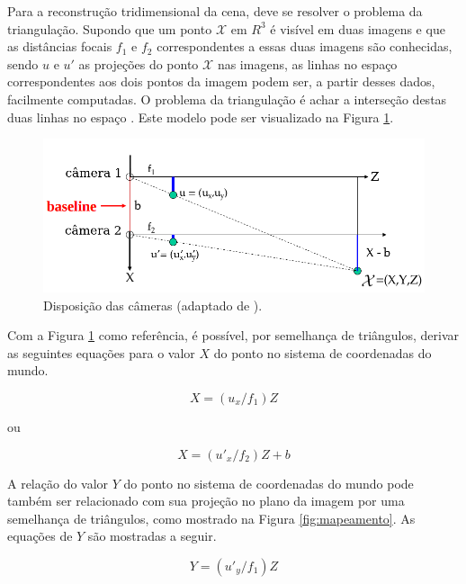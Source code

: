 {Para a reconstrução tridimensional da cena, deve se resolver o problema da
triangulação. Supondo que um ponto $\mathcal{X}$ em $R^3$ é visível em duas
imagens e que as distâncias focais $f_1$ e $f_2$ correspondentes a essas duas
imagens são conhecidas, sendo $u$ e $u'$ as projeções do ponto $\mathcal{X}$ nas
imagens, as linhas no espaço correspondentes aos dois pontos da imagem podem
ser, a partir desses dados, facilmente computadas. O problema da triangulação é
achar a interseção destas duas linhas no espaço \cite{hartley1997triangulation}.
Este modelo pode ser visualizado na Figura \ref{fig:disp_cameras}.

\begin{figure}[h!]
\centering
\includegraphics[width=.72\linewidth]{figs/TG_triangulation_pdf_washington_pt2.png}
\caption{Disposição das câmeras (adaptado de \cite{stereovision-washington-pdf}).}
\label{fig:disp_cameras}
\end{figure}


Com a Figura \ref{fig:disp_cameras} como referência, é possível, por semelhança
de triângulos, derivar as seguintes equações para o valor $X$ do ponto no
sistema de coordenadas do mundo.

\begin{equation}
X = (u_x/f_1)  Z
\label{eq:3d_realX1}
\end{equation}   

ou

\begin{equation}
X = (u'_x/f_2)  Z + b
\label{eq:3d_realX2}
\end{equation}  

A relação do valor $Y$ do ponto no sistema de coordenadas do mundo pode também
ser relacionado com sua projeção no plano da imagem por uma semelhança de
triângulos, como mostrado na Figura \ref{fig:mapeamento}. As equações de $Y$ são
mostradas a seguir.

\begin{equation}
Y = (u'_y/f_1) Z
\label{eq:3d_realY1}
\end{equation}      

}
